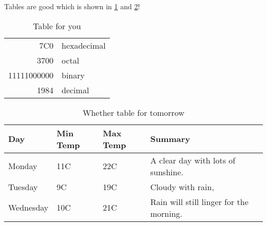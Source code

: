 


Tables are good \cite{ATraveler} which is shown in \ref{table: you} and 
\ref{table: whether}!
\begin{table}[ht] 
    \centering 
    \begin{tabular}{|r|l|}
        \hline
        7C0 & hexadecimal \\
        3700 & octal \\ \cline{2-2}
        11111000000 & binary \\
        \hline \hline
        1984 & decimal \\
        \hline
    \end{tabular}
    \caption[You-table]{Table for you}
    \label{table: you} %
\end{table} 

\begin{table}[ht] 
    \centering 
    \begin{tabular}{ | l | l | l | p{5cm} |}
        \hline
        Day & Min Temp & Max Temp & Summary \\ \hline
        Monday & 11C & 22C & A clear day with lots of sunshine. \\ \hline
        Tuesday & 9C & 19C & Cloudy with rain, \\ \hline
        Wednesday & 10C & 21C & Rain will still linger for the morning.\\
        \hline
    \end{tabular}
    \caption[Weather table]{Whether table for tomorrow}
    \label{table: whether} 
\end{table} 


